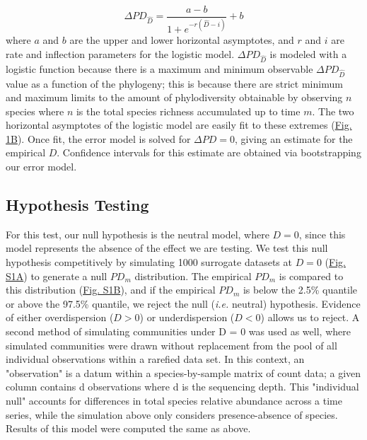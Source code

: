 \documentclass{article}
\begin{document}
\begin{equation}
	\label{sec:equation2}
	\Delta PD_{\hat{D}} = \frac {a-b} { 1 + e^{-r(\hat{D} -i)} } + b 
\end{equation}
where \(a\) and \(b\) are the upper and lower horizontal asymptotes, and \(r\) and \(i\) are rate and inflection parameters for the logistic model. \(\Delta PD_{\hat{D}}\) is modeled with a logistic function because there is a maximum and minimum observable \(\Delta PD_{\hat{D}}\) value as a function of the phylogeny; this is because there are strict minimum and maximum limits to the amount of phylodiversity obtainable by observing \(n\) species where \(n\) is the total species richness accumulated up to time \(m\). The two horizontal asymptotes of the logistic model are easily fit to these extremes (\hyperref[sec:figure1]{Fig. 1B}). Once fit, the error model is solved for \(\Delta PD=0\), giving an estimate for the empirical \(D\). Confidence intervals for this estimate are obtained via bootstrapping our error model.

\subsection{Hypothesis Testing} \label{sec:hypothesisTesting}
For this test, our null hypothesis is the neutral model, where \(D = 0\), since this model represents the absence of the effect we are testing. We test this null hypothesis competitively by simulating 1000 surrogate datasets at \(D = 0\) (\hyperref[sec:figureS1]{Fig. S1A}) to generate a null \(PD_m\) distribution. The empirical \(PD_m\) is compared to this distribution (\hyperref[sec:figureS1]{Fig. S1B}), and if the empirical \(PD_m\) is below the 2.5\% quantile or above the 97.5\% quantile, we reject the null (\emph{i.e.} neutral) hypothesis. Evidence of either overdispersion (\(D > 0\)) or underdispersion (\(D < 0\)) allows us to reject. A second method of simulating communities under D = 0 was used as well, where simulated communities were drawn without replacement from the pool of all individual observations within a rarefied data set. In this context, an "observation" is a datum within a species-by-sample matrix of count data; a given column contains d observations where d is the sequencing depth. This "individual null" accounts for differences in total species relative abundance across a time series, while the simulation above only considers presence-absence of species. Results of this model were computed the same as above. 
\end{document}
